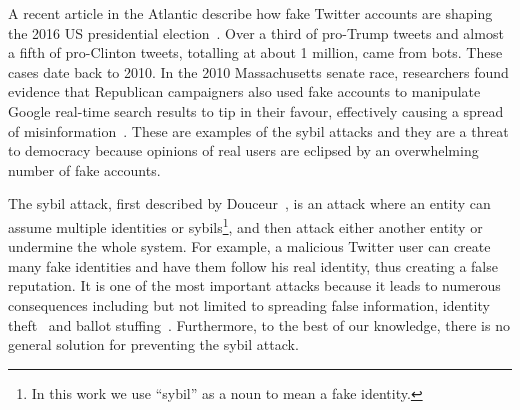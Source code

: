 
\begin{comment}
Electronic commerce and online social networks allow us to orchestrate many
aspects of our lives in the comfort of our homes, behind the monitors of our
devices. With such services, online identity is often required. For example in
Twitter\footnote{Twitter (\texttt{https://twitter.com/}) is a social network website
  where users can send and read short messages---called ``tweets'', users can
  also ``follow'' each other.}, users must create accounts to tweet a friend,
who must also have an account. In this scenario, users can choose to remain
pseudonymous if they are careful, where their real-life identity is uncorrelated
with their online identity. While that is useful for protecting the users'
privacy, it also opens an alleyway for attackers.
\end{comment}

A recent article in the Atlantic describe how fake Twitter accounts are shaping
the 2016 US presidential election~\cite{atlantictwitterbots}. Over a third of
pro-Trump tweets and almost a fifth of pro-Clinton tweets, totalling at about 1
million, came from bots. These cases date back to 2010. In the 2010
Massachusetts senate race, researchers found evidence that Republican
campaigners also used fake accounts to manipulate Google real-time search
results to tip in their favour, effectively causing a spread of
misinformation~\cite{mustafaraj2010obscurity}. These are examples of the sybil
attacks and they are a threat to democracy because opinions of real users are
eclipsed by an overwhelming number of fake accounts.

The sybil attack, first described by Douceur~\cite{douceur2002sybil}, is an
attack where an entity can assume multiple identities or sybils\footnote{In this
  work we use ``sybil'' as a noun to mean a fake identity.}, and then attack
either another entity or undermine the whole system. For example, a malicious
Twitter user can create many fake identities and have them follow his real
identity, thus creating a false reputation. It is one of the most important
attacks because it leads to numerous consequences including but not limited to
spreading false information, identity theft~\cite{bilge2009all} and ballot
stuffing~\cite{bhattacharjee2005avoiding}. Furthermore, to the best of our
knowledge, there is no general solution for preventing the sybil attack.

